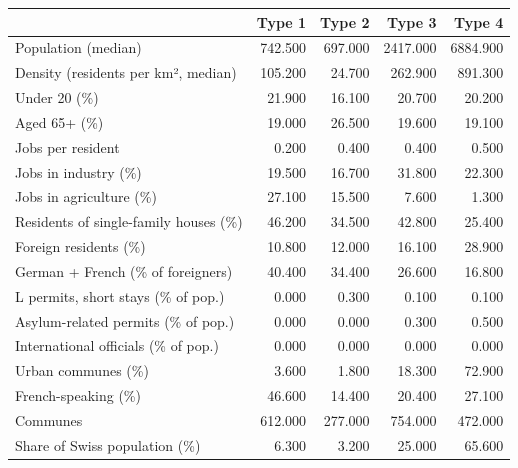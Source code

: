 \begin{tabular}{lrrrr}
\toprule
 & Type 1 & Type 2 & Type 3 & Type 4 \\
\midrule
Population (median) & 742.500 & 697.000 & 2417.000 & 6884.900 \\
Density (residents per km², median) & 105.200 & 24.700 & 262.900 & 891.300 \\
Under 20 (\%) & 21.900 & 16.100 & 20.700 & 20.200 \\
Aged 65+ (\%) & 19.000 & 26.500 & 19.600 & 19.100 \\
Jobs per resident & 0.200 & 0.400 & 0.400 & 0.500 \\
Jobs in industry (\%) & 19.500 & 16.700 & 31.800 & 22.300 \\
Jobs in agriculture (\%) & 27.100 & 15.500 & 7.600 & 1.300 \\
Residents of single-family houses (\%) & 46.200 & 34.500 & 42.800 & 25.400 \\
Foreign residents (\%) & 10.800 & 12.000 & 16.100 & 28.900 \\
German + French (\% of foreigners) & 40.400 & 34.400 & 26.600 & 16.800 \\
L permits, short stays (\% of pop.) & 0.000 & 0.300 & 0.100 & 0.100 \\
Asylum-related permits (\% of pop.) & 0.000 & 0.000 & 0.300 & 0.500 \\
International officials (\% of pop.) & 0.000 & 0.000 & 0.000 & 0.000 \\
Urban communes (\%) & 3.600 & 1.800 & 18.300 & 72.900 \\
French-speaking (\%) & 46.600 & 14.400 & 20.400 & 27.100 \\
Communes & 612.000 & 277.000 & 754.000 & 472.000 \\
Share of Swiss population (\%) & 6.300 & 3.200 & 25.000 & 65.600 \\
\bottomrule
\end{tabular}
